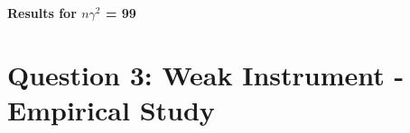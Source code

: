 \documentclass[11pt]{article}
\begin{document}
\begin{center}
	
	\centering
	
	\textbf{Results for $n \gamma^2$ = 99}\par\medskip
	\scalebox{1}{
		
	}
\end{center}




\section{Question 3: Weak Instrument - Empirical Study}


\end{document}

